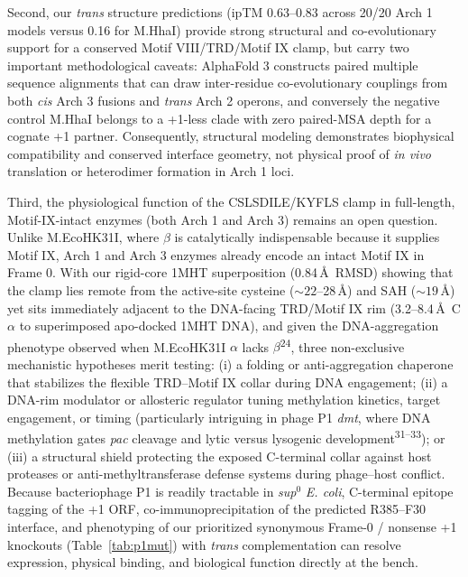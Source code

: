 \documentclass[10pt,letterpaper]{article}
\newcommand{\spname}[1]{\textit{#1}}
\newcommand{\gene}[1]{\textit{#1}}
\newcommand{\refsup}[1]{\textsuperscript{#1}}
\begin{document}
Second, our \textit{trans} structure predictions (ipTM 0.63--0.83 across 20/20 Arch 1 models versus 0.16 for M.HhaI) provide strong structural and co-evolutionary support for a conserved Motif VIII/TRD/Motif IX clamp, but carry two important methodological caveats: AlphaFold 3 constructs paired multiple sequence alignments that can draw inter-residue co-evolutionary couplings from both \textit{cis} Arch 3 fusions and \textit{trans} Arch 2 operons, and conversely the negative control M.HhaI belongs to a +1-less clade with zero paired-MSA depth for a cognate +1 partner. Consequently, structural modeling demonstrates biophysical compatibility and conserved interface geometry, not physical proof of \textit{in vivo} translation or heterodimer formation in Arch 1 loci.

Third, the physiological function of the CSLSDILE/KYFLS clamp in full-length, Motif-IX-intact enzymes (both Arch 1 and Arch 3) remains an open question. Unlike M.EcoHK31I, where $\beta$ is catalytically indispensable because it supplies Motif IX, Arch 1 and Arch 3 enzymes already encode an intact Motif IX in Frame 0. With our rigid-core 1MHT superposition (0.84\,\AA\ RMSD) showing that the clamp lies remote from the active-site cysteine ($\sim 22$--28\,\AA) and SAH ($\sim 19$\,\AA) yet sits immediately adjacent to the DNA-facing TRD/Motif IX rim (3.2--8.4\,\AA\ C$\alpha$ to superimposed apo-docked 1MHT DNA), and given the DNA-aggregation phenotype observed when M.EcoHK31I $\alpha$ lacks $\beta$\refsup{24}, three non-exclusive mechanistic hypotheses merit testing: (i) a folding or anti-aggregation chaperone that stabilizes the flexible TRD--Motif IX collar during DNA engagement; (ii) a DNA-rim modulator or allosteric regulator tuning methylation kinetics, target engagement, or timing (particularly intriguing in phage P1 \gene{dmt}, where DNA methylation gates \gene{pac} cleavage and lytic versus lysogenic development\refsup{31--33}); or (iii) a structural shield protecting the exposed C-terminal collar against host proteases or anti-methyltransferase defense systems during phage--host conflict. Because bacteriophage P1 is readily tractable in \gene{sup}$^0$ \spname{E. coli}, C-terminal epitope tagging of the +1 ORF, co-immunoprecipitation of the predicted R385--F30 interface, and phenotyping of our prioritized synonymous Frame-0 / nonsense +1 knockouts (Table~\ref{tab:p1mut}) with \textit{trans} complementation can resolve expression, physical binding, and biological function directly at the bench.

\end{document}
